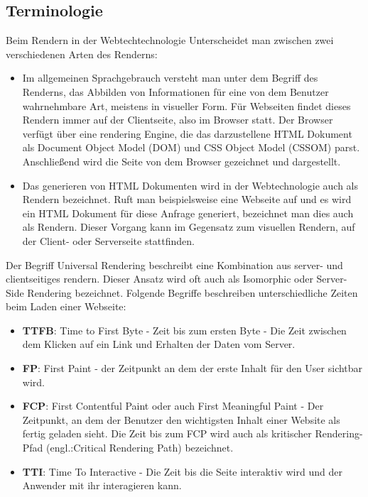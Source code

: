 \documentclass[runningheads]{llncs}
\begin{document}
\subsection{Terminologie}
\label{subsec:Terminologie}
Beim Rendern in der Webtechtechnologie Unterscheidet man zwischen 
zwei verschiedenen Arten des Renderns:
\begin{itemize}
  \setlength\itemsep{1em}
  \item Im allgemeinen Sprachgebrauch versteht man unter dem
  Begriff des Renderns, das Abbilden von Informationen für eine von dem Benutzer
  wahrnehmbare Art, meistens in visueller Form. Für Webseiten findet dieses Rendern 
  immer auf der Clientseite, also im Browser statt. Der Browser verfügt über eine rendering Engine,
  die das darzustellene HTML Dokument als Document Object Model (DOM) und CSS Object Model (CSSOM) parst.
  Anschließend wird die Seite von dem Browser gezeichnet und dargestellt.\cite{chen_geroimenko_2006}
  \item Das generieren von HTML Dokumenten wird in der Webtechnologie auch als Rendern 
  bezeichnet. Ruft man beispielsweise eine Webseite auf und es wird ein HTML Dokument für diese 
  Anfrage generiert, bezeichnet man dies auch als Rendern. Dieser Vorgang kann im Gegensatz zum visuellen Rendern,
  auf der Client- oder Serverseite stattfinden.
\end{itemize}
Der Begriff Universal Rendering beschreibt eine Kombination aus server- und clientseitiges rendern. 
Dieser Ansatz wird oft auch als Isomorphic oder Server-Side Rendering bezeichnet.
Folgende Begriffe beschreiben unterschiedliche Zeiten beim Laden einer Webseite:
\begin{itemize}
  \setlength\itemsep{1em}
  \item \textbf{TTFB}: Time to First Byte - Zeit bis zum ersten Byte -  Die Zeit zwischen dem Klicken auf ein Link und Erhalten der Daten vom Server.
  \item \textbf{FP}: First Paint - der Zeitpunkt an dem der erste Inhalt für den User sichtbar wird.
  \item \textbf{FCP}: First Contentful Paint oder auch First Meaningful Paint - Der Zeitpunkt, an dem der Benutzer den wichtigsten Inhalt einer Website als fertig geladen sieht. Die Zeit bis zum FCP wird auch als kritischer Rendering-Pfad (engl.:Critical Rendering Path) bezeichnet.
  \item \textbf{TTI}: Time To Interactive - Die Zeit bis die Seite interaktiv wird und der Anwender mit ihr interagieren kann.
\end{itemize}
\end{document}
